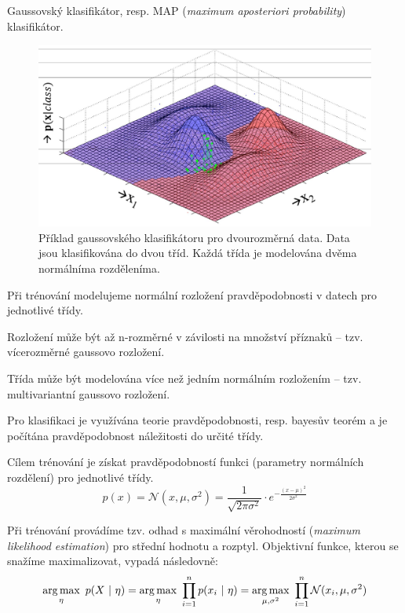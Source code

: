 \begin{compactitem}
    \item Gaussovský klasifikátor, resp. MAP (\textit{maximum aposteriori probability}) klasifikátor.

    \begin{figure}[H]
        \centering
        \includegraphics[width=0.9\linewidth]{gauss_classification.pdf}
        \caption{Příklad gaussovského klasifikátoru pro dvourozměrná data. Data jsou klasifikována do dvou tříd. Každá třída je modelována dvěma normálníma rozděleníma.}
    \end{figure}

    \item Při trénování modelujeme normální rozložení pravděpodobnosti v datech pro jednotlivé třídy. \begin{compactitem}
        \item Rozložení může být až n-rozměrné v závilosti na množství příznaků -- tzv. vícerozměrné gaussovo rozložení.
        \item Třída může být modelována více než jedním normálním rozložením -- tzv. multivariantní gaussovo rozložení.
    \end{compactitem}

    \item Pro klasifikaci je využívána teorie pravděpodobnosti, resp. bayesův teorém a je počítána pravděpodobnost náležitosti do určité třídy.

    \item Cílem trénování je získat pravděpodobností funkci (parametry normálních rozdělení) pro jednotlivé třídy.
    $${\displaystyle p(x) = \mathcal{N}(x, \mu, \sigma^2) = \frac{1}{\sqrt{2 \pi \sigma^2}} \cdot e^{- \frac{(x - \mu)^2}{2 \sigma^2}} }$$

    \item Při trénování provádíme tzv. odhad s maximální věrohodností (\textit{maximum likelihood estimation}) pro střední hodnotu a rozptyl. Objektivní funkce, kterou se snažíme maximalizovat, vypadá následovně:
    $$ {\displaystyle \operatorname*{arg\,max}_{\eta} ~ p(X ~|~ \eta) = \operatorname*{arg\,max}_{\eta} ~ \prod_{i=1}^{n} p(x_i ~|~ \mathbf{\eta}) = \operatorname*{arg\,max}_{\mu, \sigma^2} ~ \prod_{i=1}^{n} \mathcal{N}(x_i, \mu, \sigma^2)} $$


\end{compactitem}
